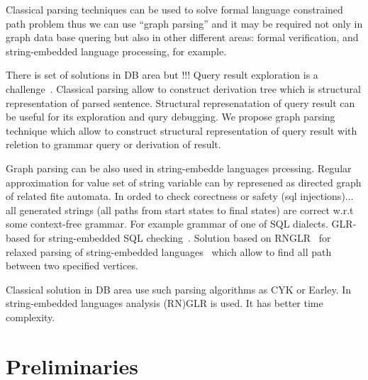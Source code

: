 \documentclass{sig-alternate} %
\begin{document}
Classical parsing techniques can be used to solve formal language constrained path problem thus we can use ``graph parsing'' and it may be required not only in graph data base quering but also in other 
different areas: formal verification, and string-embedded language processing, for example.

There is set of solutions in DB area but !!! Query result exploration is a challenge~\cite{hofman2015separabilityForRegQueryDebugging}. 
Classical parsing allow to construct derivation tree which is structural representation of parsed sentence.
Structural represenatation of query result can be useful for its exploration and qury debugging.
We propose graph parsing technique which allow to construct structural representation of query result with reletion to grammar query or derivation of result.

Graph parsing can be also used in string-embedde languages prcessing. 
Regular approximation for value set of string variable can by represened as directed graph of related fite automata.
In orded to check corectness or safety (sql injections)... all generated strings (all paths from start states to final states) are correct w.r.t some context-free grammar.
For example grammar of one of SQL dialects.
GLR-based for string-embedded SQL checking~\cite{Alvor1, Alvor2}.
Solution based on RNGLR~\cite{rnglr} for relaxed parsing of string-embedded languages~\cite{relaxedRNGLR} which allow to find all path between two specified vertices.

Classical solution in DB area use such parsing algorithms as CYK or Earley.
In string-embedded languages analysis (RN)GLR is used.
It has better time complexity.

\section{Preliminaries}
\end{document}
